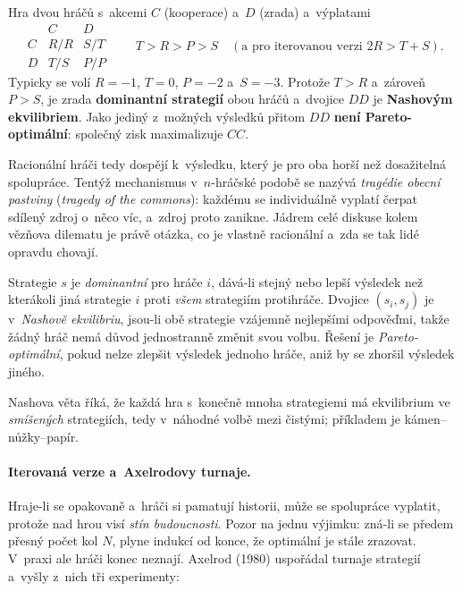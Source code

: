 \documentclass[11pt,a4paper]{article}
\theoremstyle{definition}
\begin{document}
\begin{defbox}
Hra dvou hráčů s~akcemi $C$ (kooperace) a~$D$ (zrada) a~výplatami
\[
\begin{array}{c|cc}
 & C & D\\\hline
C & R/R & S/T\\
D & T/S & P/P
\end{array}
\qquad
T > R > P > S \quad (\text{a pro iterovanou verzi } 2R > T+S).
\]
Typicky se volí $R=-1$, $T=0$, $P=-2$ a~$S=-3$. Protože $T > R$ a~zároveň $P > S$, je zrada
\textbf{dominantní strategií} obou hráčů a~dvojice $DD$ je \textbf{Nashovým ekvilibriem}.
Jako jediný z~možných výsledků přitom $DD$ \textbf{není Pareto-optimální}: společný zisk
maximalizuje $CC$.
\end{defbox}

Racionální hráči tedy dospějí k~výsledku, který je pro oba horší než dosažitelná spolupráce.
Tentýž mechanismus v~$n$-hráčské podobě se nazývá \emph{tragédie obecní pastviny}
(\emph{tragedy of the commons}): každému se individuálně vyplatí čerpat sdílený zdroj
o~něco víc, a~zdroj proto zanikne. Jádrem celé diskuse kolem vězňova dilematu je právě
otázka, co je vlastně racionální a~zda se tak lidé opravdu chovají.

\begin{defbox}
Strategie $s$ je \emph{dominantní} pro hráče $i$, dává-li stejný nebo lepší výsledek než
kterákoli jiná strategie $i$ proti \emph{všem} strategiím protihráče. Dvojice $(s_i, s_j)$
je v~\emph{Nashově ekvilibriu}, jsou-li obě strategie vzájemně nejlepšími odpověďmi, takže
žádný hráč nemá důvod jednostranně změnit svou volbu. Řešení je \emph{Pareto-optimální},
pokud nelze zlepšit výsledek jednoho hráče, aniž by se zhoršil výsledek jiného.

Nashova věta říká, že každá hra s~konečně mnoha strategiemi má ekvilibrium ve \emph{smíšených}
strategiích, tedy v~náhodné volbě mezi čistými; příkladem je kámen--nůžky--papír.
\end{defbox}

\paragraph{Iterovaná verze a~Axelrodovy turnaje.} Hraje-li se opakovaně a~hráči si pamatují
historii, může se spolupráce vyplatit, protože nad hrou visí \emph{stín budoucnosti}.
Pozor na jednu výjimku: zná-li se předem přesný počet kol $N$, plyne indukcí od konce, že
optimální je stále zrazovat. V~praxi ale hráči konec neznají. Axelrod (1980) uspořádal
turnaje strategií a~vyšly z~nich tři experimenty:
\end{document}
